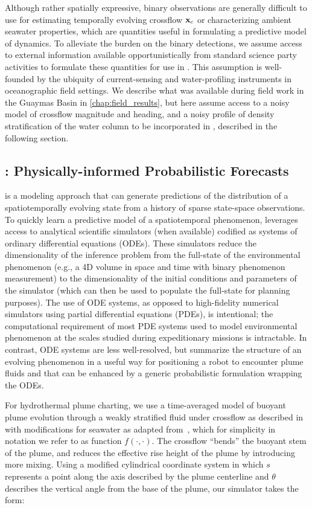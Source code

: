 Although rather spatially expressive, binary observations are generally difficult to use for estimating temporally evolving crossflow $\mathbf{x}_c$ or characterizing ambient seawater properties, which are quantities useful in formulating a predictive model of dynamics. To alleviate the burden on the binary detections, we assume access to external information available opportunistically from standard science party activities to formulate these quantities for use in \PHUMES. This assumption is well-founded by the ubiquity of current-sensing and water-profiling instruments in oceanographic field settings. We describe what was available during field work in the Guaymas Basin in \cref{chap:field_results}, but here assume access to a noisy model of crossflow magnitude and heading, and a noisy profile of density stratification of the water column to be incorporated in \PHUMES, described in the following section. 

\subsection{\PHUMES: Physically-informed Probabilistic Forecasts}
\label{sec:phumes}
\PHUMES is a modeling approach that can generate predictions of the distribution of a spatiotemporally evolving state from a history of sparse state-space observations. To quickly learn a predictive model of a spatiotemporal phenomenon, \PHUMES leverages access to analytical scientific simulators (when available) codified as systems of ordinary differential equations (ODEs). These simulators reduce the dimensionality of the inference problem from the full-state of the environmental phenomenon (e.g., a 4D volume in space and time with binary phenomenon measurement) to the dimensionality of the initial conditions and parameters of the simulator (which can then be used to populate the full-state for planning purposes). The use of ODE systems, as opposed to high-fidelity numerical simulators using partial differential equations (PDEs), is intentional; the computational requirement of most PDE systems used to model environmental phenomenon at the scales studied during expeditionary missions is intractable. In contrast, ODE systems are less well-resolved, but summarize the structure of an evolving phenomenon in a useful way for positioning a robot to encounter plume fluids and that can be enhanced by a generic probabilistic formulation wrapping the ODEs.

For hydrothermal plume charting, we use a time-averaged model of buoyant plume evolution through a weakly stratified fluid under crossflow as described in~\cite{tohidi2016highly} with modifications for seawater as adapted from~\cite{xu2012deep}, which for simplicity in notation we refer to as function $f(\cdot, \cdot)$. The crossflow ``bends'' the buoyant stem of the plume, and reduces the effective rise height of the plume by introducing more mixing. Using a modified cylindrical coordinate system in which $s$ represents a point along the axis described by the plume centerline and $\theta$ describes the vertical angle from the base of the plume, our \PHUMES simulator takes the form:

